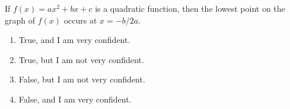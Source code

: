 \bigskip


\item If $f(x) = ax^2 + bx + c$ is a quadratic function, then the lowest point on the graph of $f(x)$ occurs at $x = -b/2a$.

\begin{enumerate}
\item True, and I am very confident.
\item True, but I am not very confident.
\item False, but I am not very confident.
\item False, and I am very confident.
\end{enumerate}


